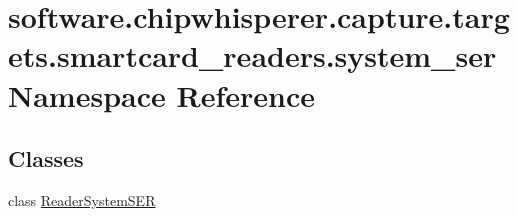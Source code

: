 \hypertarget{namespacesoftware_1_1chipwhisperer_1_1capture_1_1targets_1_1smartcard__readers_1_1system__ser}{}\section{software.\+chipwhisperer.\+capture.\+targets.\+smartcard\+\_\+readers.\+system\+\_\+ser Namespace Reference}
\label{namespacesoftware_1_1chipwhisperer_1_1capture_1_1targets_1_1smartcard__readers_1_1system__ser}
\subsection*{Classes}
\begin{DoxyCompactItemize}
\item 
class \hyperlink{classsoftware_1_1chipwhisperer_1_1capture_1_1targets_1_1smartcard__readers_1_1system__ser_1_1ReaderSystemSER}{Reader\+System\+S\+E\+R}
\end{DoxyCompactItemize}

